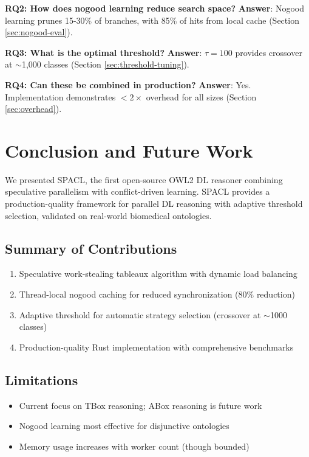 \documentclass[preprint,12pt]{elsarticle}
\begin{document}
\textbf{RQ2: How does nogood learning reduce search space?}  
\textbf{Answer}: Nogood learning prunes 15-30\% of branches, with 85\% of hits from local cache (Section \ref{sec:nogood-eval}).

\textbf{RQ3: What is the optimal threshold?}  
\textbf{Answer}: $\tau = 100$ provides crossover at $\sim$1,000 classes (Section \ref{sec:threshold-tuning}).

\textbf{RQ4: Can these be combined in production?}  
\textbf{Answer}: Yes. Implementation demonstrates $<2\times$ overhead for all sizes (Section \ref{sec:overhead}).

\section{Conclusion and Future Work}
\label{sec:conclusion}

We presented SPACL, the first open-source OWL2 DL reasoner combining speculative parallelism with conflict-driven learning. SPACL provides a production-quality framework for parallel DL reasoning with adaptive threshold selection, validated on real-world biomedical ontologies.

\subsection{Summary of Contributions}
\label{sec:summary}

\begin{enumerate}
    \item Speculative work-stealing tableaux algorithm with dynamic load balancing
    \item Thread-local nogood caching for reduced synchronization (80\% reduction)
    \item Adaptive threshold for automatic strategy selection (crossover at $\sim$1000 classes)
    \item Production-quality Rust implementation with comprehensive benchmarks
\end{enumerate}

\subsection{Limitations}
\label{sec:limitations}

\begin{itemize}
    \item Current focus on TBox reasoning; ABox reasoning is future work
    \item Nogood learning most effective for disjunctive ontologies
    \item Memory usage increases with worker count (though bounded)
\end{itemize}
\end{document}
